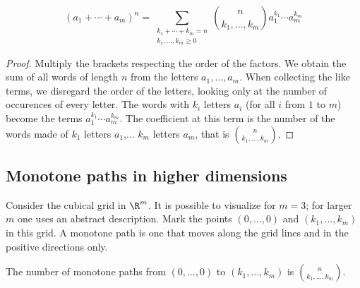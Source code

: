 \begin{page}
\setcounter{section}{4}
\setcounter{subsection}{2}
\setcounter{dfn}{2}
\label{portion:117}

\begin{thm}
\[
(a_1 + \cdots + a_m)^n = \sum_{\substack{k_1 + \cdots + k_m = n\\ k_1, \ldots, k_m \ge 0}}
\binom{n}{k_1, \ldots, k_m} a_1^{k_1} \cdots a_m^{k_m}
\]
\end{thm}

\end{page}

\begin{page}
\setcounter{section}{4}
\setcounter{subsection}{3}
\setcounter{dfn}{2}
\label{portion:118}

\begin{proof}
Multiply the brackets respecting the order of the factors.
We obtain the sum of all words of length $n$ from the letters $a_1, \ldots, a_m$.
When collecting the like terms, we disregard the order of the letters, looking only at the number of occurences of every letter.
The words with $k_i$ letters $a_i$ (for all $i$ from $1$ to $m$) become the terms $a_1^{k_1} \cdots a_m^{k_m}$.
The coefficient at this term is the number of the words made of $k_1$ letters $a_1$,... $k_m$ letters $a_m$,
that is $\binom{n}{k_1, \ldots, k_m}$.
\end{proof}



\end{page}

\begin{page}
\setcounter{section}{4}
\setcounter{subsection}{3}
\setcounter{dfn}{2}
\label{portion:119}

\subsection{Monotone paths in higher dimensions}
Consider the cubical grid in $\R^m$.
It is possible to visualize for $m=3$; for larger $m$ one uses an abstract description.
Mark the points $(0, \ldots, 0)$ and $(k_1, \ldots, k_m)$ in this grid.
A monotone path is one that moves along the grid lines and in the positive directions only.


\end{page}

\begin{page}
\setcounter{section}{4}
\setcounter{subsection}{3}
\setcounter{dfn}{3}
\label{portion:121}

\begin{thm}
The number of monotone paths from $(0, \ldots, 0)$ to $(k_1, \ldots, k_m)$ is $\binom{n}{k_1, \ldots, k_m}$.
\end{thm}

\end{page}

